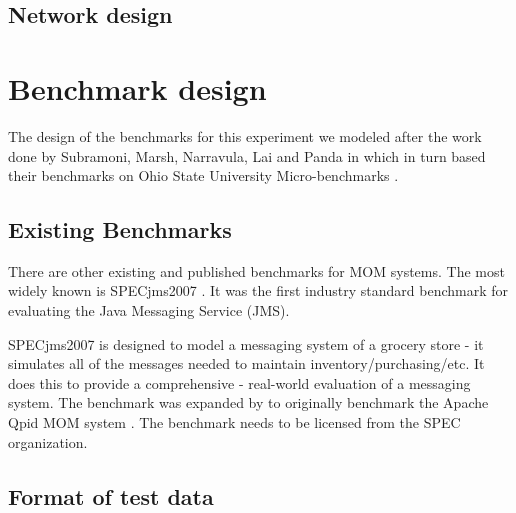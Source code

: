 \documentclass{thesis}
\begin{document}
\subsection{Network design}


\section{Benchmark design}

The design of the benchmarks for this experiment we modeled after the work done by Subramoni, Marsh, Narravula, Lai and Panda in \cite{Subramoni} which in turn based their benchmarks on Ohio State University Micro-benchmarks \cite{OSU_MICRO_BENCHMARKS}.

\subsection{Existing Benchmarks}
There are other existing and published benchmarks for MOM systems.  The most widely known is SPECjms2007 \cite{SPEC_JMS2007}.  It was the first industry standard benchmark for evaluating the Java Messaging Service (JMS).

SPECjms2007 is designed to model a messaging system of a grocery store - it simulates all of the messages needed to maintain inventory/purchasing/etc.  It does this to provide a comprehensive - real-world evaluation of a messaging system.  The benchmark was expanded by  to originally benchmark the Apache Qpid MOM system \cite{citation needed}.  The benchmark needs to be licensed from the SPEC organization.  


\subsection{Format of test data}




\end{document}
